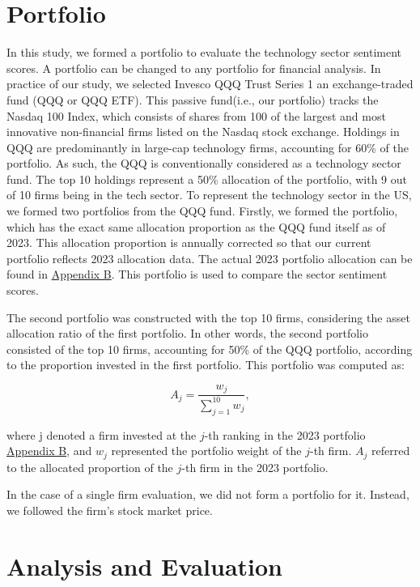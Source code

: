 \documentclass[logo,bsc,singlespacing,parskip]{infthesis}
\begin{document}
\section{Portfolio}
\label{portfolio}
In this study, we formed a portfolio to evaluate the technology sector sentiment scores. A portfolio can be changed to any portfolio for financial analysis. In practice of our study, we selected Invesco QQQ Trust Series 1 an exchange-traded fund (QQQ or QQQ ETF). This passive fund(i.e., our portfolio) tracks the Nasdaq 100 Index, which consists of shares from 100 of the largest and most innovative non-financial firms listed on the Nasdaq stock exchange. Holdings in QQQ are predominantly in large-cap technology firms, accounting for 60\% of the portfolio. As such, the QQQ is conventionally considered as a technology sector fund. The top 10 holdings represent a 50\% allocation of the portfolio, with 9 out of 10 firms being in the tech sector. To represent the technology sector in the US, we formed two portfolios from the QQQ fund. Firstly, we formed the portfolio, which has the exact same allocation proportion as the QQQ fund itself as of 2023. This allocation proportion is annually corrected so that our current portfolio reflects 2023 allocation data.  The actual 2023 portfolio allocation can be found in \hyperref[appendix_qqq]{Appendix B}. This portfolio is used to compare the sector sentiment scores.

The second portfolio was constructed with the top 10 firms, considering the asset allocation ratio of the first portfolio. In other words, the second portfolio consisted of the top 10 firms, accounting for 50\% of the QQQ portfolio, according to the proportion invested in the first portfolio. This portfolio was computed as:

\begin{equation} \label{5.3}
A_j = \frac{w_j}{\sum_{j=1}^{10} w_j}
,
\end{equation}


where j denoted a firm invested at the $j$-th ranking in the 2023 portfolio \hyperref[appendix_qqq]{Appendix B}, and $w_j$ represented the portfolio weight of the $j$-th firm. $A_j$ referred to the allocated proportion of the $j$-th firm in the 2023 portfolio. 

In the case of a single firm evaluation, we did not form a portfolio for it. Instead, we followed the firm’s stock market price.

\section{Analysis and Evaluation}
\end{document}
